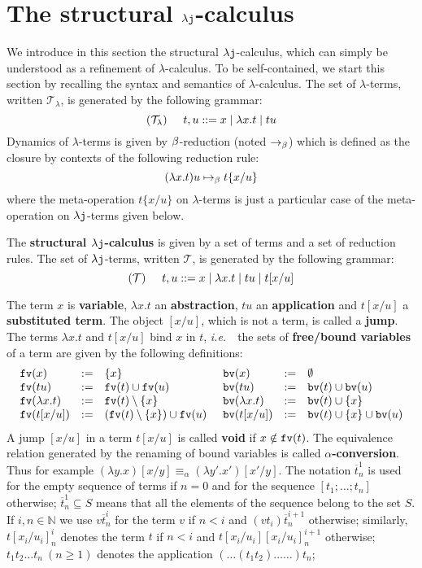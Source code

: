 \documentclass{LMCS}
\newcommand{\ie}{{\it  i.e.}~}
\newcommand{\sep}{\hspace*{0.5cm}}
\renewcommand{\>}{\rightarrow}
\def\lam{\lambda}
\newcommand{\Rew}[1]{\rightarrow_{#1}}
\newcommand{\isubs}[1]{ \{ #1  \} }
\newcommand{\nat}{{\mathbb N}}
\newcommand{\dis}{{\tt j}}
\newcommand{\ldis}{\lam{\dis}}
\newcommand{\fv}[1]{{\tt fv}(#1)}
\newcommand{\bv}[1]{\texttt{bv}(#1)}
\newcommand{\Beta}{{\tt \beta}}
\newcommand{\set}[1]{ \{ #1 \}}
\newcommand{\ems}{\emptyset}
\newcommand{\terms}{\mathcal{T}}
\newcommand{\termslambda}{\terms_{\lam}}
\newcommand{\deft}[1]{{\bf #1}}
\newcommand{\esp}[4]{[{#1}_i/{#2}_i]^{#3}_{#4}}
\newcommand{\ovl}[3]{\overline{#1}^{#2}_{#3}}
\begin{document}
\section{The structural $\ldis$-calculus}
\label{s:structural-lj}


We introduce in this section the structural $\ldis$-calculus,
which can simply be understood as a refinement of  $\lam$-calculus.  To be self-contained, 
we start this section by recalling the syntax and semantics of $\lam$-calculus. 
The set of $\lam$-terms,  written  $\termslambda$,
is generated by the following grammar:
\[ (\termslambda) \sep t, u :: = x \mid \lam x. t \mid t u  \]
Dynamics of $\lam$-terms is   given by $\Beta$-reduction (noted $\Rew{\Beta}$) 
which is  defined as the closure by contexts of
the following reduction rule:
$$(\lam x . t) u \mapsto_{\Beta} t\isubs{x/u}$$  
where the meta-operation $t\isubs{x/u}$ on $\lam$-terms is just a particular case
of the meta-operation on $\ldis$-terms given below.



The \deft{structural $\ldis$-calculus} is given by a set of
terms and a set of reduction rules. The set of $\ldis$-terms,  written  $\terms$,
is generated by the following grammar:
\[ (\terms) \sep t, u :: = x \mid \lam x. t \mid t u \mid t[x/u] \]

The term $x$ is \deft{variable}, $\lam x. t$ an \deft{abstraction}, $tu$
an \deft{application} and $t[x/u]$ a \deft{substituted term}. The object
$[x/u]$, which is not a term, is called a \deft{jump}.  The terms $\lam 
x.  t$ and $t[x/u]$ bind $x$ in $t$, \ie\ the sets of \deft{free/bound
  variables} of a term are given by the following definitions:
\[ \begin{array}{lll@{\sep}lll}
\fv{x} & := & \set{x} & \bv{x} & := & \ems \\
\fv{tu} &:=& \fv{t} \cup \fv{u} & \bv{tu} & := & \bv{t} \cup \bv{u}\\
\fv{\lam  x.t}&:=& \fv{t}\setminus\set{x} & \bv{\lam  x.t}& :=& \bv{t} \cup \set{x}\\
\fv{t[x/u]}&:=&(\fv{t}\setminus\set{x}) \cup\fv{u} 
& \bv{t[x/u]}&:=& \bv{t}\cup \set{x}\cup\bv{u} \\  
\end{array} \] 
A jump $[x/u]$ in a
term $t[x/u]$ is called \deft{void} if $x \notin \fv{t}$.  The
equivalence relation generated by the renaming of bound variables is
called \deft{$\alpha$-conversion}.  Thus for example $(\lam y.  x)[x/y]
\equiv_{\alpha} (\lam y'. x')[x'/y]$.  
The notation $\ovl{t}{1}{n}$ is used for the empty sequence of terms if $n=0$ and
for the sequence $[t_1; \ldots; t_n]$ otherwise; $\ovl{t}{1}{n} \subseteq  S$ 
means that all the elements of the sequence belong to the set $S$.
If $i,n\in\nat$ we use $v\ovl{t}{i}{n}$ for the term $v$ if $n<i$ and 
$(v t_i)\ovl{t}{i+1}{n}$ otherwise; similarly, $t\esp{x}{u}{i}{n}$ 
denotes the term $t$ if $n<i$ and 
$t[x_i/u_i]\esp{x}{u}{i+1}{n}$ otherwise; 
$t_1 t_2
\ldots t_n\ (n \geq 1)$ denotes the application 
$(\ldots (t_1 t_2) \ldots \ldots ) t_n$; 
\end{document}
